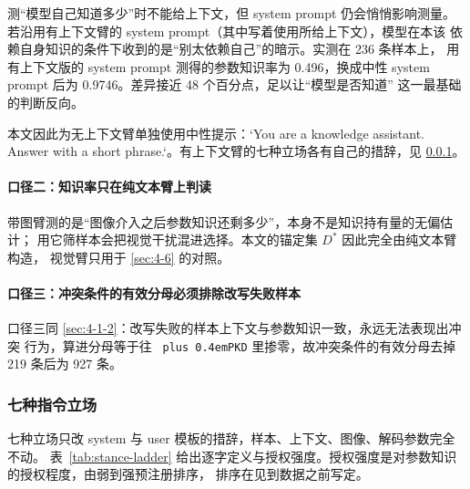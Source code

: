 \documentclass[10.5pt,compsoc,UTF8]{CjC}
\theoremstyle{mystyle}
\DeclareRobustCommand{\code}[1]{\texttt{\spaceskip=0pt plus 0.4em\relax#1}}
\begin{document}
测“模型自己知道多少”时不能给上下文，但 system prompt 仍会悄悄影响测量。
若沿用有上下文臂的 system prompt（其中写着使用所给上下文），模型在本该
依赖自身知识的条件下收到的是“别太依赖自己”的暗示。实测在 236 条样本上，
用有上下文版的 system prompt 测得的参数知识率为 0.496，换成中性
system prompt 后为 0.9746。差异接近 48 个百分点，足以让“模型是否知道”
这一最基础的判断反向。

本文因此为无上下文臂单独使用中性提示：`You are a knowledge assistant.
Answer with a short phrase.`。有上下文臂的七种立场各有自己的措辞，见 \ref{sec:4-3-2}。

\paragraph{口径二：知识率只在纯文本臂上判读}
\label{sec:x17b8e010ee}

带图臂测的是“图像介入之后参数知识还剩多少”，本身不是知识持有量的无偏估计；
用它筛样本会把视觉干扰混进选择。本文的锚定集 $D^*$ 因此完全由纯文本臂构造，
视觉臂只用于 \ref{sec:4-6} 的对照。

\paragraph{口径三：冲突条件的有效分母必须排除改写失败样本}
\label{sec:x357e5e1775}

口径三同 \ref{sec:4-1-2}：改写失败的样本上下文与参数知识一致，永远无法表现出冲突
行为，算进分母等于往 \code{PKD} 里掺零，故冲突条件的有效分母去掉 219 条后为 927 条。

\subsubsection{七种指令立场}
\label{sec:4-3-2}

七种立场只改 system 与 user 模板的措辞，样本、上下文、图像、解码参数完全不动。
表~\ref{tab:stance-ladder} 给出逐字定义与授权强度。授权强度是对参数知识的授权程度，由弱到强预注册排序，
排序在见到数据之前写定。
\end{document}
